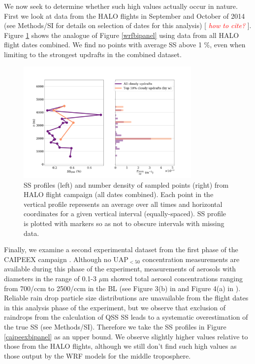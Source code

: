 \documentclass{article}
\newcommand{\klcomm}[1]{\textcolor{red}{\textit{#1}}}
\begin{document}
\clearpage
\newpage

We now seek to determine whether such high values actually occur in nature. First we look at data from the HALO flights in September and October of 2014 (see Methods/SI for details on selection of dates for this analysis) [ \klcomm{how to cite?} ]. Figure \ref{halobipanel} shows the analogue of Figure \ref{wrfbipanel} using data from all HALO flight dates combined. We find no points with average SS above 1 \%, even when limiting to the strongest updrafts in the combined dataset.

\begin{figure}[ht]
    \centering
    \includegraphics[width=9cm]{revhalo/v3_FINAL_combined_bipanel_ss_qss_vs_z_figure.png}
    \caption{SS profiles (left) and number density of sampled points (right) from HALO flight campaign (all dates combined). Each point in the vertical profile represents an average over all times and horizontal coordinates for a given vertical interval (equally-spaced). SS profile is plotted with markers so as not to obscure intervals with missing data.}
    \label{halobipanel}
\end{figure}

Finally, we examine a second experimental dataset from the first phase of the CAIPEEX campaign \cite{Kulkarni2012}. Although no UAP$_{<50}$ concentration measurements are available during this phase of the experiment, measurements of aerosols with diameters in the range of 0.1-3 $\mu$m showed total aerosol concentrations ranging from 700/ccm to 2500/ccm in the BL (see Figure 3(b) in \cite{Prabha2011} and Figure 4(a) in \cite{Kulkarni2012}). Reliable rain drop particle size distributions are unavailable from the flight dates in this analysis phase of the experiment, but we observe that exclusion of raindrops from the calculation of QSS SS leads to a systematic overestimation of the true SS (see Methods/SI). Therefore we take the SS profiles in Figure \ref{caipeexbipanel} as an upper bound. We observe slightly higher values relative to those from the HALO flights, although we still don't find such high values as those output by the WRF models for the middle troposphere.
\end{document}
